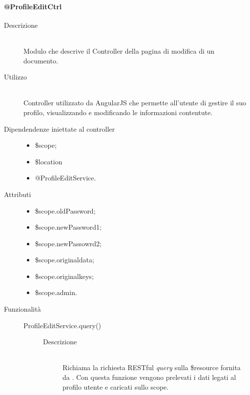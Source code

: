 \paragraph{@ProfileEditCtrl}
\begin{description}
 \item[Descrizione] \hfill \\
 Modulo che descrive il Controller della pagina di modifica di un documento.
 
 \item[Utilizzo] \hfill \\
 Controller utilizzato da AngularJS che permette all'utente di gestire il suo profilo, visualizzando e modificando le informazioni contentute.\\ 
 \item[Dipendendenze iniettate al controller] \hfill
 \begin{itemize}
  \item \$scope;
  \item \$location
  \item @ProfileEditService.
  
 \end{itemize}
 
 \item[Attributi] \hfill
 \begin{itemize}
 \item \$scope.oldPassword;
 \item \$scope.newPassword1;
 \item \$scope.newPassowrd2;
 \item \$scope.original\textunderscore data;
 \item \$scope.original\textunderscore keys;
 \item \$scope.admin.
 \end{itemize}
 
 \item[Funzionalità] \hfill
 \begin{description}
  \item[ProfileEditService.query()] \hfill
  \begin{description}
  	\item[Descrizione] \hfill \\
   Richiama la richiesta RESTful \textit{query} sulla \$resource fornita da .
  Con questa funzione vengono prelevati i dati legati al profilo utente e caricati sullo scope.
	 
  \end{description}


\end{description}
\end{description}
